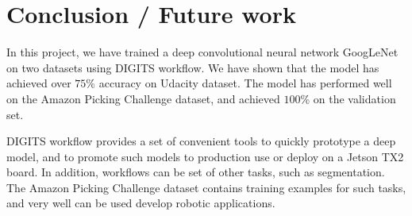 \documentclass[10pt,journal,compsoc]{IEEEtran}
\begin{document}
\section{Conclusion / Future work}

In this project, we have trained a deep convolutional neural network GoogLeNet on two datasets using DIGITS workflow. We have shown that the model has achieved over $75$\% accuracy on Udacity dataset. The model has performed well on the  Amazon Picking Challenge dataset, and achieved $100$\% on the validation set. 

DIGITS workflow provides a set of convenient tools to quickly prototype a deep model, and to promote such models to production use or deploy on a Jetson TX2 board. In addition, workflows can be set of other tasks, such as segmentation. The  Amazon Picking Challenge dataset contains  training examples for such tasks, and very well can be used develop robotic applications.   



\end{document}
